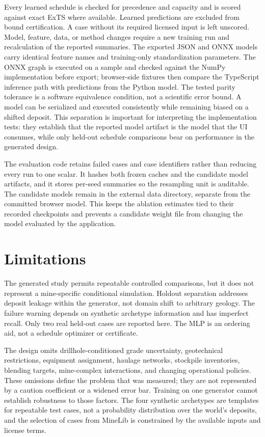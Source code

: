 \documentclass[11pt]{article}
\begin{document}
Every learned schedule is checked for precedence and capacity and is scored against exact ExTS where available. Learned predictions are excluded from bound certification. A case without its required licensed input is left unscored. Model, feature, data, or method changes require a new training run and recalculation of the reported summaries.
The exported JSON and ONNX models carry identical feature names and training-only standardization parameters. The ONNX graph is executed on a sample and checked against the NumPy implementation before export; browser-side fixtures then compare the TypeScript inference path with predictions from the Python model. The tested parity tolerance is a software equivalence condition, not a scientific error bound. A model can be serialized and executed consistently while remaining biased on a shifted deposit. This separation is important for interpreting the implementation tests: they establish that the reported model artifact is the model that the UI consumes, while only held-out schedule comparisons bear on performance in the generated design.

The evaluation code retains failed cases and case identifiers rather than reducing every run to one scalar. It hashes both frozen caches and the candidate model artifacts, and it stores per-seed summaries so the resampling unit is auditable. The candidate models remain in the external data directory, separate from the committed browser model. This keeps the ablation estimates tied to their recorded checkpoints and prevents a candidate weight file from changing the model evaluated by the application.
\section{Limitations}
The generated study permits repeatable controlled comparisons, but it does not represent a mine-specific conditional simulation. Holdout separation addresses deposit leakage within the generator, not domain shift to arbitrary geology. The failure warning depends on synthetic archetype information and has imperfect recall. Only two real held-out cases are reported here. The MLP is an ordering aid, not a schedule optimizer or certificate.

The design omits drillhole-conditioned grade uncertainty, geotechnical restrictions, equipment assignment, haulage networks, stockpile inventories, blending targets, mine-complex interactions, and changing operational policies. These omissions define the problem that was measured; they are not represented by a caution coefficient or a widened error bar. Training on one generator cannot establish robustness to those factors. The four synthetic archetypes are templates for repeatable test cases, not a probability distribution over the world's deposits, and the selection of cases from MineLib is constrained by the available inputs and license terms.
\end{document}

